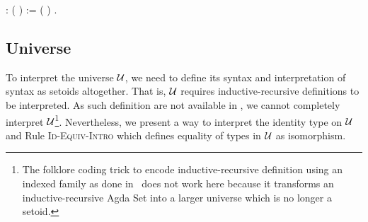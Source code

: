 \begin{coqdoccode}
\coqdocindent{1.00em}
:  ( ) :=  \coqdocnotation{(} \coqdocvar{$\gamma$}  \coqdocnotation{(} \coqdocnotation{$\star$} \coqdocvariable{$\gamma$}\coqdocnotation{)} (   \coqdocvariable{$\gamma$})\coqdocnotation{;}  \coqdocvar{\_} \coqdocvar{\_}\coqdocnotation{)} \coqdocnotation{$\star$} .\coqdoceol
\coqdocemptyline
\coqdocemptyline
\end{coqdoccode}


\subsection{Universe}


  \label{sec:universe} 
  To interpret the universe $\mathcal{U}$, we need to define its syntax and interpretation of syntax as setoids altogether. That is, $\mathcal{U}$ requires inductive-recursive definitions to be interpreted.
  As such definition are not available in \Coq, we cannot completely interpret $\mathcal{U}$\footnote{The folklore coding trick to encode inductive-recursive definition using an indexed family as done in~\cite{altenkirch-mcbride-wierstra:ott-now} does not work here because it transforms an inductive-recursive Agda Set into a larger universe which is no longer a setoid.}. Nevertheless, we present a way to interpret the identity type on $\mathcal{U}$ and Rule \textsc{Id-Equiv-Intro} which defines equality of types in $\mathcal{U}$ as isomorphism.



